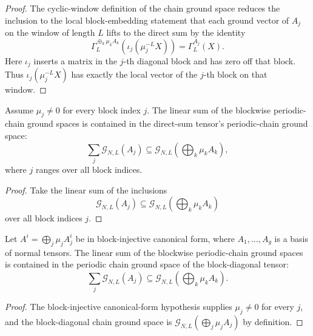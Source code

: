 \begin{proof}
    \leanok
    The cyclic-window definition of the chain ground space reduces the inclusion to
    the local block-embedding statement that each ground vector of $A_j$ on the
    window of length $L$ lifts to the direct sum by the identity
    \[
        \Gamma_L^{\oplus_k\mu_k A_k}\!\left(\iota_j(\mu_j^{-L}X)\right)
        =
        \Gamma_L^{A_j}(X).
    \]
    Here $\iota_j$ inserts a matrix in the $j$-th diagonal block and has zero
    off that block. Thus $\iota_j(\mu_j^{-L}X)$ has exactly the local vector of
    the $j$-th block on that window.
\end{proof}

\begin{lemma}
    \label{lem:isup_chain_ground_space_block_le_assembled}
    \leanok
    Assume $\mu_{j} \neq 0$ for every block index $j$. The linear sum of the
    blockwise periodic-chain ground spaces is contained in the direct-sum
    tensor's periodic-chain ground space:
    \[
        \sum_{j} \mathcal G_{N,L}(A_{j})
        \subseteq
        \mathcal G_{N,L}\!\left(\bigoplus_k \mu_k A_k\right),
    \]
    where $j$ ranges over all block indices.
\end{lemma}

\begin{proof}
    \leanok
    Take the linear sum of the inclusions
    \[
        \mathcal G_{N,L}(A_j)
        \subseteq
        \mathcal G_{N,L}\!\left(\bigoplus_k \mu_k A_k\right)
    \]
    over all block indices $j$.
\end{proof}

\begin{lemma}
    \label{lem:isup_chain_ground_space_block_le_parent_ground_space}
    \notready
    Let $A^i=\bigoplus_j\mu_j A_j^i$ be in block-injective canonical form,
    where $A_1,\ldots,A_g$ is a basis of normal tensors.  The linear sum of the
    blockwise periodic-chain ground spaces is contained in the periodic chain
    ground space of the block-diagonal tensor:
    \[
        \sum_{j} \mathcal G_{N,L}(A_{j})
        \subseteq
        \mathcal G_{N,L}\!\left(\bigoplus_k \mu_k A_k\right).
    \]
\end{lemma}

\begin{proof}
    \notready
    The block-injective canonical-form hypothesis supplies $\mu_{j} \neq 0$ for
    every $j$, and the block-diagonal chain ground space is
    $\mathcal G_{N,L}(\bigoplus_j \mu_j A_j)$ by definition.
\end{proof}
